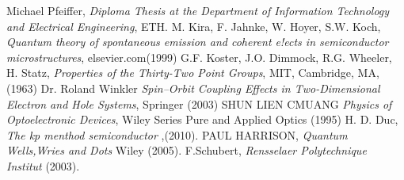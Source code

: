 \begin{thebibliography}{99}
Michael Pfeiffer, \textit{Diploma Thesis at the Department of Information Technology and Electrical Engineering}, ETH.
M. Kira, F. Jahnke, W. Hoyer, S.W. Koch, \textit{Quantum theory of spontaneous emission and coherent e!ects in semiconductor
microstructures}, elsevier.com(1999)
G.F. Koster, J.O. Dimmock, R.G. Wheeler, H. Statz, \textit{Properties of the Thirty-Two Point Groups}, MIT, Cambridge, MA, (1963)
 Dr. Roland Winkler \textit{Spin–Orbit Coupling Effects
in Two-Dimensional Electron and Hole Systems}, Springer (2003)
 SHUN LIEN CMUANG \textit{Physics of Optoelectronic Devices}, Wiley Series Pure and Applied Optics (1995)
H. D. Duc, \textit{The kp menthod semiconductor },(2010).
 PAUL HARRISON, \textit{Quantum Wells,Wries and Dots} Wiley (2005).
 F.Schubert, \textit{Rensselaer Polytechnique Institut}  (2003).

\end{thebibliography}